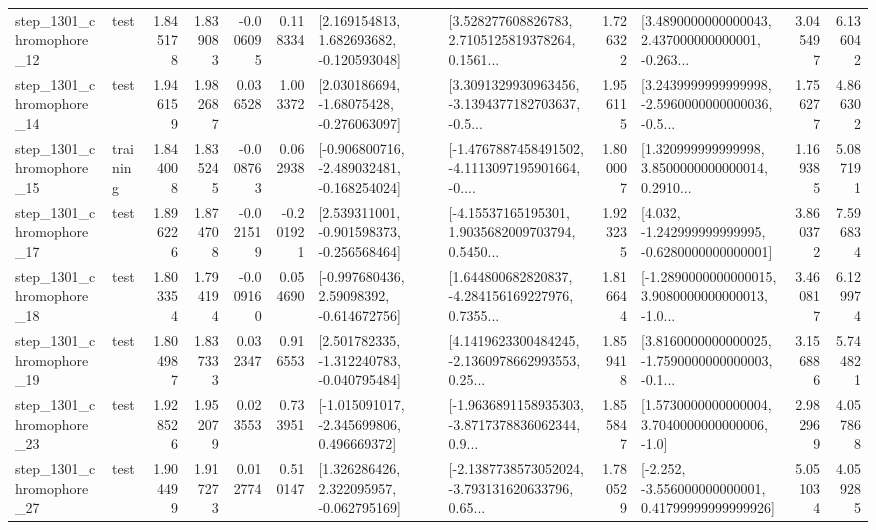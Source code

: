 \begin{tabular}{llrrrrllrlrr}
 step\_1301\_chromophore\_12 &      test &      1.845178 &    1.839083 &     -0.006095 &  0.118334 &    [2.169154813, 1.682693682, -0.120593048] &  [3.528277608826783, 2.7105125819378264, 0.1561... &       1.726322 &  [3.4890000000000043, 2.437000000000001, -0.263... &            3.045497 &          6.136042 \\
 step\_1301\_chromophore\_14 &      test &      1.946159 &    1.982687 &      0.036528 &  1.003372 &    [2.030186694, -1.68075428, -0.276063097] &  [3.3091329930963456, -3.1394377182703637, -0.5... &       1.956115 &  [3.2439999999999998, -2.5960000000000036, -0.5... &            1.756277 &          4.866302 \\
 step\_1301\_chromophore\_15 &  training &      1.844008 &    1.835245 &     -0.008763 &  0.062938 &  [-0.906800716, -2.489032481, -0.168254024] &  [-1.4767887458491502, -4.1113097195901664, -0.... &       1.800007 &  [1.320999999999998, 3.8500000000000014, 0.2910... &            1.169385 &          5.087191 \\
 step\_1301\_chromophore\_17 &      test &      1.896226 &    1.874708 &     -0.021519 & -0.201921 &   [2.539311001, -0.901598373, -0.256568464] &  [-4.15537165195301, 1.9035682009703794, 0.5450... &       1.923235 &   [4.032, -1.242999999999995, -0.6280000000000001] &            3.860372 &          7.596834 \\
 step\_1301\_chromophore\_18 &      test &      1.803354 &    1.794194 &     -0.009160 &  0.054690 &    [-0.997680436, 2.59098392, -0.614672756] &  [1.644800682820837, -4.284156169227976, 0.7355... &       1.816644 &  [-1.2890000000000015, 3.9080000000000013, -1.0... &            3.460817 &          6.129974 \\
 step\_1301\_chromophore\_19 &      test &      1.804987 &    1.837333 &      0.032347 &  0.916553 &   [2.501782335, -1.312240783, -0.040795484] &  [4.1419623300484245, -2.1360978662993553, 0.25... &       1.859418 &  [3.8160000000000025, -1.7590000000000003, -0.1... &            3.156886 &          5.744821 \\
 step\_1301\_chromophore\_23 &      test &      1.928526 &    1.952079 &      0.023553 &  0.733951 &   [-1.015091017, -2.345699806, 0.496669372] &  [-1.9636891158935303, -3.8717378836062344, 0.9... &       1.855847 &     [1.5730000000000004, 3.7040000000000006, -1.0] &            2.982969 &          4.057868 \\
 step\_1301\_chromophore\_27 &      test &      1.904499 &    1.917273 &      0.012774 &  0.510147 &    [1.326286426, 2.322095957, -0.062795169] &  [-2.1387738573052024, -3.793131620633796, 0.65... &       1.780529 &  [-2.252, -3.556000000000001, 0.41799999999999926] &            5.051034 &          4.059285 \\

\end{tabular}
